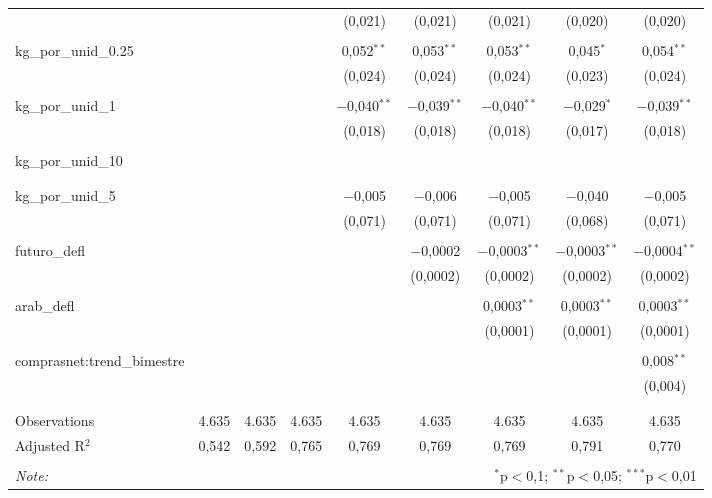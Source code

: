 \begin{table}[!htbp]
\begin{tabular}{@{\extracolsep{5pt}}lcccccccc}
  &  &  &  & (0,021) & (0,021) & (0,021) & (0,020) & (0,020) \\ 
  & & & & & & & & \\ 
 kg\_por\_unid\_0.25 &  &  &  & 0,052$^{**}$ & 0,053$^{**}$ & 0,053$^{**}$ & 0,045$^{*}$ & 0,054$^{**}$ \\ 
  &  &  &  & (0,024) & (0,024) & (0,024) & (0,023) & (0,024) \\ 
  & & & & & & & & \\ 
 kg\_por\_unid\_1 &  &  &  & $-$0,040$^{**}$ & $-$0,039$^{**}$ & $-$0,040$^{**}$ & $-$0,029$^{*}$ & $-$0,039$^{**}$ \\ 
  &  &  &  & (0,018) & (0,018) & (0,018) & (0,017) & (0,018) \\ 
  & & & & & & & & \\ 
 kg\_por\_unid\_10 &  &  &  &  &  &  &  &  \\ 
  &  &  &  &  &  &  &  &  \\ 
  & & & & & & & & \\ 
 kg\_por\_unid\_5 &  &  &  & $-$0,005 & $-$0,006 & $-$0,005 & $-$0,040 & $-$0,005 \\ 
  &  &  &  & (0,071) & (0,071) & (0,071) & (0,068) & (0,071) \\ 
  & & & & & & & & \\ 
 futuro\_defl &  &  &  &  & $-$0,0002 & $-$0,0003$^{**}$ & $-$0,0003$^{**}$ & $-$0,0004$^{**}$ \\ 
  &  &  &  &  & (0,0002) & (0,0002) & (0,0002) & (0,0002) \\ 
  & & & & & & & & \\ 
 arab\_defl &  &  &  &  &  & 0,0003$^{**}$ & 0,0003$^{**}$ & 0,0003$^{**}$ \\ 
  &  &  &  &  &  & (0,0001) & (0,0001) & (0,0001) \\ 
  & & & & & & & & \\ 
 comprasnet:trend\_bimestre &  &  &  &  &  &  &  & 0,008$^{**}$ \\ 
  &  &  &  &  &  &  &  & (0,004) \\ 
  & & & & & & & & \\ 
\hline \\[-1.8ex] 
Observations & 4.635 & 4.635 & 4.635 & 4.635 & 4.635 & 4.635 & 4.635 & 4.635 \\ 
Adjusted R$^{2}$ & 0,542 & 0,592 & 0,765 & 0,769 & 0,769 & 0,769 & 0,791 & 0,770 \\ 
\hline 
\hline \\[-1.8ex] 
\textit{Note:}  & \multicolumn{8}{r}{$^{*}$p$<$0,1; $^{**}$p$<$0,05; $^{***}$p$<$0,01} \\ 
\end{tabular} 
\end{table} 
